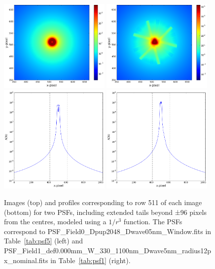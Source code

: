 \documentclass[11pt]{article}      %
\begin{document}
\begin{figure}[htbp]
  \begin{center}
    \includegraphics[width=0.48\textwidth]{extendedPSF_radial.png}
    \includegraphics[width=0.48\textwidth]{extendedPSF_triangular.png}\\
    \includegraphics[width=0.48\textwidth]{extendedPSF_radial_profile.png}
    \includegraphics[width=0.48\textwidth]{extendedPSF_triangular_profile.png}
    \caption{Images (top) and profiles corresponding to row 511 of each image (bottom) for two PSFs, including extended tails beyond ±96 pixels from the centres, modeled using a $1/r^3$ function. The PSFs correspond to PSF\_Field0\_Dpup2048\_Dwave05nm\_Window.fits in Table~\ref{tab:psf5} (left) and PSF\_Field1\_def0.000mm\_W\_330\_1100nm\_Dwave5nm\_radius12px\_nominal.fits in Table~\ref{tab:psf1} (right).}
    \label{fig:psfExtension}
  \end{center}
\end{figure}
\end{document}
